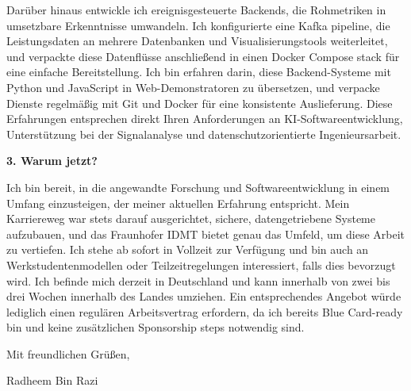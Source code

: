 \documentclass[11pt,a4paper]{coverletter}
\begin{document}
Darüber hinaus entwickle ich ereignisgesteuerte Backends, die Rohmetriken in umsetzbare Erkenntnisse umwandeln. Ich konfigurierte eine Kafka pipeline, die Leistungsdaten an mehrere Datenbanken und Visualisierungstools weiterleitet, und verpackte diese Datenflüsse anschließend in einen Docker Compose stack für eine einfache Bereitstellung. Ich bin erfahren darin, diese Backend-Systeme mit Python und JavaScript in Web-Demonstratoren zu übersetzen, und verpacke Dienste regelmäßig mit Git und Docker für eine konsistente Auslieferung. Diese Erfahrungen entsprechen direkt Ihren Anforderungen an KI-Softwareentwicklung, Unterstützung bei der Signalanalyse und datenschutzorientierte Ingenieursarbeit.

\vspace{8pt}\noindent\textbf{3. Warum jetzt?}\par\vspace{3pt}

Ich bin bereit, in die angewandte Forschung und Softwareentwicklung in einem Umfang einzusteigen, der meiner aktuellen Erfahrung entspricht. Mein Karriereweg war stets darauf ausgerichtet, sichere, datengetriebene Systeme aufzubauen, und das Fraunhofer IDMT bietet genau das Umfeld, um diese Arbeit zu vertiefen. Ich stehe ab sofort in Vollzeit zur Verfügung und bin auch an Werkstudentenmodellen oder Teilzeitregelungen interessiert, falls dies bevorzugt wird. Ich befinde mich derzeit in Deutschland und kann innerhalb von zwei bis drei Wochen innerhalb des Landes umziehen. Ein entsprechendes Angebot würde lediglich einen regulären Arbeitsvertrag erfordern, da ich bereits Blue Card-ready bin und keine zusätzlichen Sponsorship steps notwendig sind.

\closing{Mit freundlichen Grüßen,}{Radheem Bin Razi}
\end{document}
